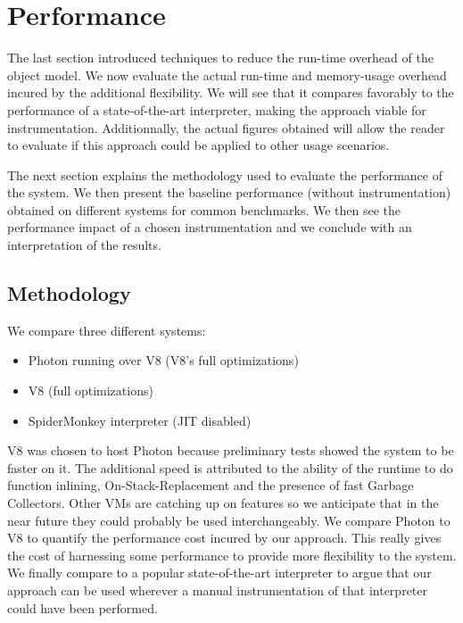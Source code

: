 \chapter{Performance}
\label{chap:Performance}

The last section introduced techniques to reduce the run-time overhead of the
object model. We now evaluate the actual run-time and memory-usage overhead
incured by the additional flexibility. We will see that it compares favorably
to the performance of a state-of-the-art interpreter, making the approach
viable for instrumentation. Additionnally, the actual figures obtained will
allow the reader to evaluate if this approach could be applied to other usage
scenarios.

The next section explains the methodology used to evaluate the performance of
the system. We then present the baseline performance (without instrumentation)
obtained on different systems for common benchmarks. We then see the
performance impact of a chosen instrumentation and we conclude with an
interpretation of the results. 


\section{Methodology}

We compare three different systems:
\begin{itemize}
    \item Photon running over V8 (V8's full optimizations)
    \item V8 (full optimizations)
    \item SpiderMonkey interpreter (JIT disabled)
\end{itemize}

V8 was chosen to host Photon because preliminary tests showed the system to be
faster on it. The additional speed is attributed to the ability of the runtime
to do function inlining, On-Stack-Replacement and the presence of fast Garbage
Collectors. Other VMs are catching up on features so we anticipate that in the
near future they could probably be used interchangeably. We compare Photon to
V8 to quantify the performance cost incured by our approach. This really gives
the cost of harnessing some performance to provide more flexibility to the
system.  We finally compare to a popular state-of-the-art interpreter to argue
that our approach can be used wherever a manual instrumentation of that
interpreter could have been performed. 

